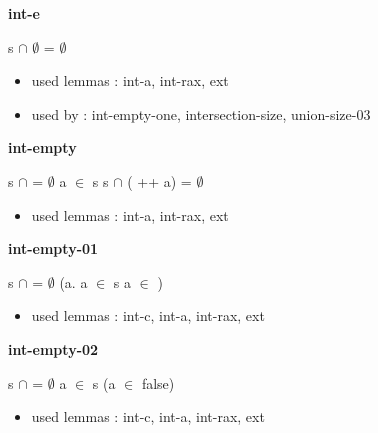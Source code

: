 \documentclass[a4paper]{article}
\begin{document}
{\large\bf int-e}

\medskip

 \Fol s $\cap$ $\emptyset$ = $\emptyset$

\begin{itemize}


\item       used lemmas  : int-a, int-rax, ext
\item       used by      : int-empty-one, intersection-size, union-size-03

\end{itemize}

\medskip

\bigskip

{\large\bf int-empty}

\medskip

 \Fol s $\cap$  = $\emptyset$ \And \Not a $\in$ s \Imp s $\cap$ ( ++ a) = $\emptyset$

\begin{itemize}


\item       used lemmas  : int-a, int-rax, ext

\end{itemize}

\medskip

\bigskip

{\large\bf int-empty-01}

\medskip

 \Fol s $\cap$  = $\emptyset$ \Equiv (\All a. \Not a $\in$ s \Or \Not a $\in$ )

\begin{itemize}


\item       used lemmas  : int-c, int-a, int-rax, ext

\end{itemize}

\medskip

\bigskip

{\large\bf int-empty-02}

\medskip

 \Fol s $\cap$  = $\emptyset$ \And a $\in$ s \Imp (\Not \Not a $\in$  \Equiv false)

\begin{itemize}


\item       used lemmas  : int-c, int-a, int-rax, ext

\end{itemize}
\end{document}
